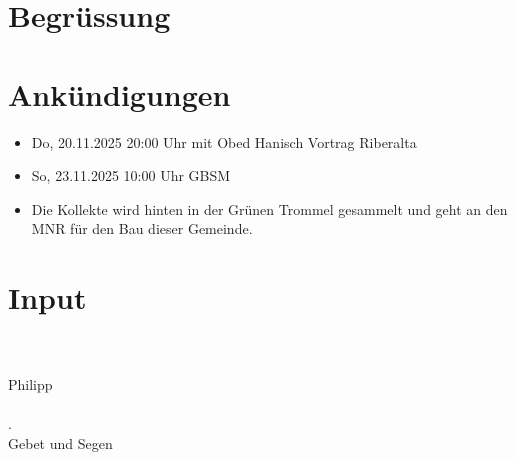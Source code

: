 \documentclass{../../inc/mybib}
\begin{document}
\section{Begrüssung}

\beten{}


\section{Ankündigungen}
\begin{itemize}
    \item {} Do, 20.11.2025 20:00 Uhr mit Obed Hanisch Vortrag Riberalta
    \item {} So, 23.11.2025 10:00 Uhr GBSM
    \item Die Kollekte wird hinten in der Grünen Trommel gesammelt und geht an den MNR für den Bau dieser Gemeinde.
\end{itemize}

\section{ Input }

     
    \\    
    \\
    Philipp\\
    \\
    .
    \\
    Gebet und Segen\\
\end{document}

